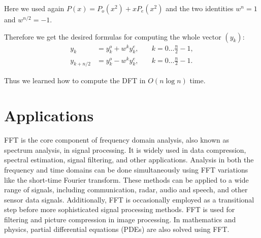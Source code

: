 \documentclass[28]{report}
\begin{document}
Here we used again $P(x) = P_o(x^2) + x P_e(x^2)$ and the two identities $w^n = 1$ and $w^{n/2} = -1$.

Therefore we get the desired formulas for computing the whole vector $(y_k)$:
\begin{align*} y_k &= y_k^o + w^k y_k^e, &\quad k = 0 \dots \frac{n}{2} - 1, \\ y_{k+n/2} &= y_k^o - w^k y_k^e, &\quad k = 0 \dots \frac{n}{2} - 1. \end{align*}

Thus we learned how to compute the DFT in $O(n \log n)$ time.


\chapter{Applications}
FFT is the core component of frequency domain analysis, also known as spectrum analysis, in signal processing. It is widely used in data compression, spectral estimation, signal filtering, and other applications. Analysis in both the frequency and time domains can be done simultaneously using FFT variations like the short-time Fourier transform. These methods can be applied to a wide range of signals, including communication, radar, audio and speech, and other sensor data signals. Additionally, FFT is occasionally employed as a transitional step before more sophisticated signal processing methods. FFT is used for filtering and picture compression in image processing. In mathematics and physics, partial differential equations (PDEs) are also solved using FFT.
\end{document}
